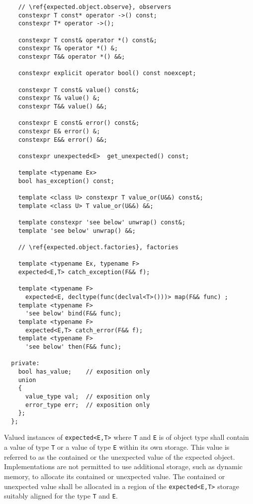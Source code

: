 \documentclass[a4paper,10pt]{article}
\newcommand{\cpp}[1]{\lstinline{#1}}
\begin{document}
\begin{lstlisting}
    // \ref{expected.object.observe}, observers
    constexpr T const* operator ->() const;
    constexpr T* operator ->();
    
    constexpr T const& operator *() const&;
    constexpr T& operator *() &;
    constexpr T&& operator *() &&;
    
    constexpr explicit operator bool() const noexcept;
    
    constexpr T const& value() const&;
    constexpr T& value() &;
    constexpr T&& value() &&;
    
    constexpr E const& error() const&;
    constexpr E& error() &;
    constexpr E&& error() &&;
    
    constexpr unexpected<E>  get_unexpected() const;
    
    template <typename Ex>
    bool has_exception() const;
      
    template <class U> constexpr T value_or(U&&) const&;
    template <class U> T value_or(U&&) &&;
    
    template constexpr 'see below' unwrap() const&;
    template 'see below' unwrap() &&;

    // \ref{expected.object.factories}, factories

    template <typename Ex, typename F>
    expected<E,T> catch_exception(F&& f);

    template <typename F>
      expected<E, decltype(func(declval<T>()))> map(F&& func) ;
    template <typename F>
      'see below' bind(F&& func);
    template <typename F>
      expected<E,T> catch_error(F&& f);
    template <typename F>
      'see below' then(F&& func);
  
  private:
    bool has_value;    // exposition only
    union
    {
      value_type val;  // exposition only
      error_type err;  // exposition only
    };
  };

\end{lstlisting}


Valued instances of \cpp{expected<E,T>} where \cpp{T} and \cpp{E} is of object type shall contain a value of type \cpp{T} or a value of type \cpp{E} within its own storage. This value is referred to as the contained or the unexpected value of the expected object. Implementations are not permitted to use additional storage, such as dynamic memory, to allocate its contained or unexpected value. The contained or unexpected value shall be allocated in a region of the \cpp{expected<E,T>} storage suitably aligned for the type \cpp{T} and \cpp{E}.
\newline
\end{document}
